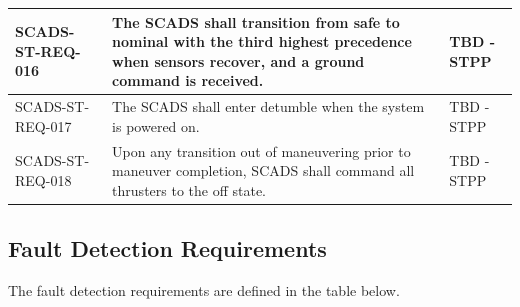 \documentclass{article}
\begin{document}
\begin{longtable}{|l|p{9cm}|p{5cm}|}
                SCADS-ST-REQ-016 & The SCADS shall transition from safe to
                                    nominal with the third highest precedence
                                    when sensors recover, and a ground command is 
                                    received. 
                                    & TBD - STPP \\ \hline
                SCADS-ST-REQ-017 & The SCADS shall enter detumble when the system
                                    is powered on. & TBD - STPP \\ \hline
                SCADS-ST-REQ-018 & Upon any transition out of maneuvering prior to
                                    maneuver completion, SCADS shall command all
                                    thrusters to the off state. & TBD - STPP \\ \hline
            \end{longtable}


        \subsection{Fault Detection Requirements}\label{sec:fault-detection-requirements}
            The fault detection requirements are defined in the table below.
\end{document}
